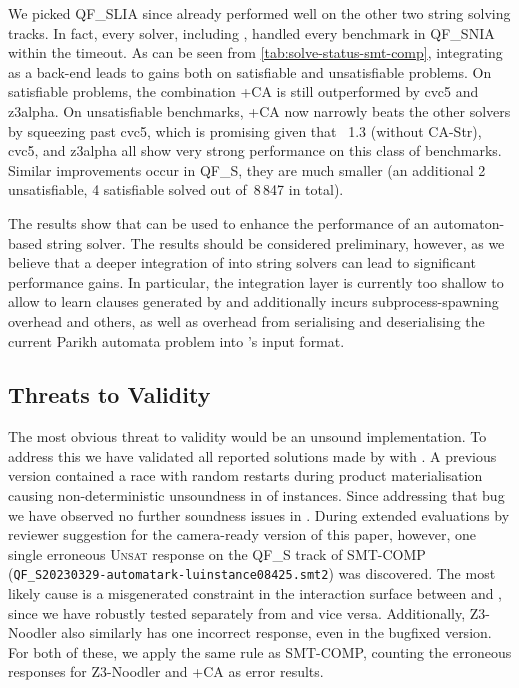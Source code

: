 We picked QF\_SLIA since
\Ostrich{} already performed well on the other two string solving tracks. In fact,
every solver, including \Ostrich{}, handled every benchmark in QF\_SNIA within the timeout.
%
As can be seen from \cref{tab:solve-status-smt-comp}, integrating \Catra{} as a back-end
leads to gains both on satisfiable and unsatisfiable problems. On
satisfiable problems, the combination \Ostrich+CA is still
outperformed by cvc5 and z3alpha. On unsatisfiable benchmarks,
\Ostrich+CA now narrowly beats the other solvers by squeezing past cvc5,
which is promising given that \Ostrich{}~1.3 (without CA-Str), cvc5, and z3alpha all show very strong
performance on this class of benchmarks. Similar improvements
occur in QF\_S, they are much smaller (an additional 2 unsatisfiable, 4 satisfiable 
solved out of~8\,847 in total).

The results show that \Calculus{} can be used to enhance the performance of an
automaton-based string solver. The results should be considered preliminary,
however, as we believe that a deeper integration of \Catra{} into string solvers
can lead to significant performance gains. In particular, the integration layer 
is currently too shallow to allow \Ostrich{} to learn clauses generated by \Catra{}
and additionally incurs subprocess-spawning overhead and others, as well as overhead
from serialising and deserialising the current Parikh automata problem into \Catra{}'s
input format.

\subsection{Threats to Validity}

The most obvious threat to validity would be an unsound implementation. To
address this we have validated all reported solutions made by \Calculus{} with
\Nuxmv{}. A previous version contained a race with random restarts during
product materialisation causing non-deterministic unsoundness in 
of instances. Since addressing that bug we have observed no further soundness
issues in \Catra{}. During extended evaluations by reviewer suggestion for the 
camera-ready version of this paper, however, one single erroneous \textsc{Unsat} 
response on the QF\_S track of 
SMT-COMP (\texttt{QF\_S\/20230329-automatark-lu\/instance08425.smt2}) was discovered.
The most likely cause is a misgenerated constraint in the interaction surface between \Ostrich{}
and \Catra{}, since we have robustly tested 
\Catra{} separately from \Ostrich{} and vice versa. Additionally, Z3-Noodler
also similarly has one incorrect response, even in the bugfixed version. For both of
these, we apply the same rule as SMT-COMP, counting the erroneous responses for Z3-Noodler
and \Ostrich{}+CA as error results.

